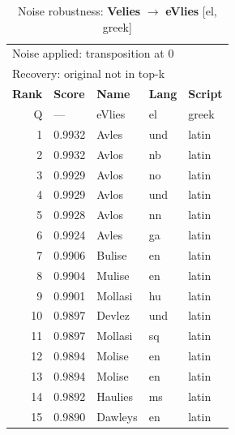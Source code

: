 \begin{table}[htbp]
\centering
\small
\caption{Noise robustness: \textbf{Velies} $\rightarrow$ \textbf{eVlies} [el, greek]}
\label{tab:noise-24}
\begin{tabular}{rllll}
\toprule
\multicolumn{5}{l}{\small Noise applied: transposition at 0} \\
\multicolumn{5}{l}{\small Recovery: original not in top-k} \\
\midrule
\textbf{Rank} & \textbf{Score} & \textbf{Name} & \textbf{Lang} & \textbf{Script} \\
\midrule
\rowcolor{gray!20} Q & --- & eVlies & el & greek \\
\midrule
1 & 0.9932 & Avles & und & latin \\
2 & 0.9932 & Avlos & nb & latin \\
3 & 0.9929 & Avlos & no & latin \\
4 & 0.9929 & Avlos & und & latin \\
5 & 0.9928 & Avlos & nn & latin \\
6 & 0.9924 & Avles & ga & latin \\
7 & 0.9906 & Bulise & en & latin \\
8 & 0.9904 & Mulise & en & latin \\
9 & 0.9901 & Mollasi & hu & latin \\
10 & 0.9897 & Devlez & und & latin \\
11 & 0.9897 & Mollasi & sq & latin \\
12 & 0.9894 & Molise & en & latin \\
13 & 0.9894 & Molise & en & latin \\
14 & 0.9892 & Haulies & ms & latin \\
15 & 0.9890 & Dawleys & en & latin \\
\bottomrule
\end{tabular}
\end{table}

